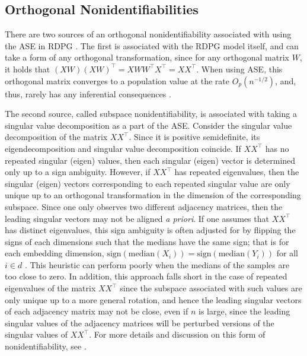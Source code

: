 \subsection{Orthogonal Nonidentifiabilities}
There are two sources of an orthogonal nonidentifiability associated with using the
ASE in RDPG \cite{on-two-sources}. The first is associated with the RDPG model itself, and can take a form of any orthogonal transformation, since for any
orthogonal matrix $W$, it holds that $(XW)(XW)^\top = X W W^\top X^\top = X X^\top$. When
using ASE, this orthogonal matrix converges to a population value at the rate 
$O_p \left(n^{-1/2}\right)$, and, thus, rarely has any inferential consequences \cite{tang2014nonparametric, on-two-sources}.

The second source, called subspace nonidentifiability, is associated with taking a singular value decomposition as a part of the ASE. 
Consider the singular value decomposition of the matrix $XX^\top$.
Since it is positive semidefinite, its eigendecomposition and singular value decomposition coincide.
If $XX^\top$ has no repeated singular (eigen) values, then each singular (eigen) vector is determined only up to a sign ambiguity.
However, if $XX^\top$ has repeated eigenvalues, then the singular (eigen) vectors corresponding to each repeated singular value are only unique up to an orthogonal transformation in the dimension of the corresponding subspace.
Since one only observes two different adjacency matrices, then the leading singular vectors may not be aligned \textit{a priori}.
If one assumes that $XX^\top$ has distinct eigenvalues, this sign ambiguity is often adjusted for by flipping the signs of each dimensions such that the medians have the same sign; that is for each embedding dimension, $\text{sign}(\text{median}(X_i)) = \text{sign}(\text{median}(Y_i))$ for all $i\in d$ \cite{tang2014nonparametric, correcting-nonpar}. 
This heuristic can perform poorly when the medians of the samples are too close to zero.
In addition, this approach falls short in the case of repeated eigenvalues of the matrix $XX^{\top}$ since the subspace associated with such values are only unique up to a more general rotation, and hence the leading singular vectors of each adjacency matrix may not be close, even if $n$ is large, since the leading singular values of the adjacency matrices will be perturbed versions of the singular values of $XX^\top$. For more details and discussion on this form of nonidentifiability, see \cite{on-two-sources}. 

